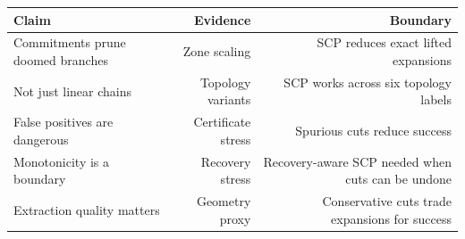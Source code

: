 \begin{tabular}{lrr}
\toprule
Claim & Evidence & Boundary \\
\midrule
Commitments prune doomed branches & Zone scaling & SCP reduces exact lifted expansions \\
Not just linear chains & Topology variants & SCP works across six topology labels \\
False positives are dangerous & Certificate stress & Spurious cuts reduce success \\
Monotonicity is a boundary & Recovery stress & Recovery-aware SCP needed when cuts can be undone \\
Extraction quality matters & Geometry proxy & Conservative cuts trade expansions for success \\
\bottomrule
\end{tabular}

